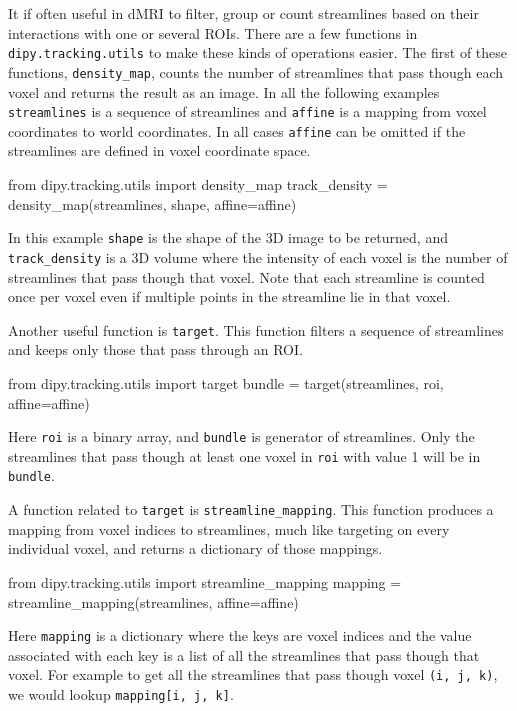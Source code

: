 \documentclass{bioinfo}
\begin{document}
It if often useful in dMRI to filter, group or count streamlines based on their
interactions with one or several ROIs. There are a few functions in
\texttt{dipy.tracking.utils} to make these kinds of operations easier. The
first of these functions, \texttt{density\_map}, counts the number of
streamlines that pass though each voxel and returns the result as an image. In
all the following examples \texttt{streamlines} is a sequence of streamlines and
\texttt{affine} is a mapping from voxel coordinates to world coordinates. In all 
cases \texttt{affine} can be omitted if the streamlines
are defined in voxel coordinate space.
\begin{python}
from dipy.tracking.utils import density_map
track_density = density_map(streamlines, shape,
                            affine=affine)
\end{python}
In this example \texttt{shape} is the shape of the 3D image to be returned, and
\texttt{track\_density} is a 3D volume where the intensity of each voxel is the
number of streamlines that pass though that voxel. Note that
each streamline is counted once per voxel even if multiple points in the
streamline lie in that voxel.

Another useful function is \texttt{target}. This function filters a sequence of
streamlines and keeps only those that pass through an ROI.
\begin{python}
from dipy.tracking.utils import target
bundle = target(streamlines, roi, affine=affine)
\end{python}
Here \texttt{roi} is a binary array, and \texttt{bundle} is generator of
streamlines.  Only the streamlines that pass though at least
one voxel in \texttt{roi} with value 1 will be in \texttt{bundle}.

A function related to \texttt{target} is \texttt{streamline\_mapping}. This
function produces a mapping from voxel indices to streamlines, much like targeting
on every individual voxel, and returns a dictionary of those mappings.
\begin{python}
from dipy.tracking.utils import streamline_mapping
mapping = streamline_mapping(streamlines, 
                             affine=affine)
\end{python}
Here \texttt{mapping} is a dictionary where the keys are voxel indices and
the value associated with each key is a list of all the streamlines that pass though that voxel. For example to get all the
streamlines that pass though voxel \texttt{(i, j, k)}, we would lookup
\texttt{mapping[i, j, k]}.
\end{document}
